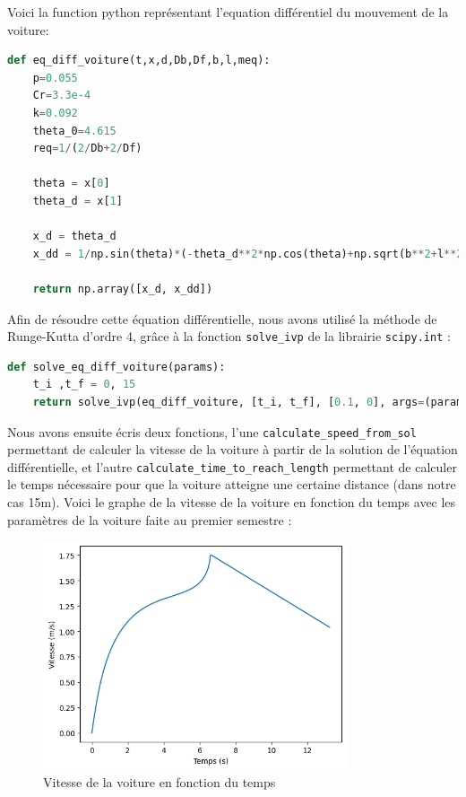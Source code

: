 \documentclass{report}
\begin{document}
Voici la function python représentant l'equation différentiel du mouvement de la voiture:\\
\begin{lstlisting}[language=Python]
def eq_diff_voiture(t,x,d,Db,Df,b,l,meq):
    p=0.055
    Cr=3.3e-4
    k=0.092
    theta_0=4.615
    req=1/(2/Db+2/Df)
    
    theta = x[0]
    theta_d = x[1]

    x_d = theta_d
    x_dd = 1/np.sin(theta)*(-theta_d**2*np.cos(theta)+np.sqrt(b**2+l**2-2*b*l*np.cos(theta))*(theta_d**2*b*l*np.sin(theta)**2/((b**2+l**2-2*b*l*np.cos(theta))**(3/2))+d/(meq*Db*b*l)*(-k*(theta-theta_0)*d*np.sqrt(b**2+l**2-2*b*l*np.cos(theta))/(Db*b*l*np.sin(theta))-Cr/req-p*Db*b*l/d*theta_d*np.sin(theta)/(np.sqrt(b**2+l**2-2*b*l*np.cos(theta))))))

    return np.array([x_d, x_dd])
\end{lstlisting}
Afin de résoudre cette équation différentielle, nous avons utilisé la méthode de Runge-Kutta d'ordre 4, grâce à la fonction \texttt{solve\_ivp} de la librairie \texttt{scipy.int} :\\
\begin{lstlisting}[language=Python]
def solve_eq_diff_voiture(params):
    t_i ,t_f = 0, 15
    return solve_ivp(eq_diff_voiture, [t_i, t_f], [0.1, 0], args=(params['d'], params['Db'], params['Df'], params['b'], params['l'], params['meq']), t_eval=np.linspace(t_i, t_f, 50))    
\end{lstlisting}
Nous avons ensuite écris deux fonctions, l'une \texttt{calculate\_speed\_from\_sol} permettant de calculer la vitesse de la voiture à partir de la solution de l'équation différentielle, et l'autre \texttt{calculate\_time\_to\_reach\_length} permettant de calculer le temps nécessaire pour que la voiture atteigne une certaine distance (dans notre cas 15m). Voici le graphe de la vitesse de la voiture en fonction du temps avec les paramètres de la voiture faite au premier semestre :\\
\begin{figure}[h]
    \centering
    \includegraphics[width=0.8\textwidth]{vitesse_temps}
    \caption{Vitesse de la voiture en fonction du temps}
\end{figure}
\end{document}
